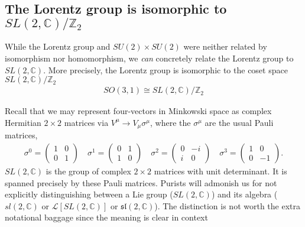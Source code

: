\subsection{\texorpdfstring{The Lorentz group is isomorphic to $SL(2,\mathbb{C})/\mathbb{Z}_2$}{The Lorentz group is isomorphic to SL(2,C)/Z2}}

While the Lorentz group and $SU(2)\times SU(2)$ were neither related by isomorphism nor homomorphism, we \textit{can} concretely relate the Lorentz group to $SL(2,\mathbb{C})$. More precisely, the Lorentz group is isomorphic to the coset space $SL(2,\mathbb{C})/\mathbb{Z}_2$
\begin{align}
    SO(3,1) \cong SL(2,\mathbb{C})/\mathbb{Z}_2
\end{align}

Recall that we may represent four-vectors in Minkowski space as complex Hermitian $2\times 2$ matrices via $V^\mu \rightarrow V_\mu\sigma^\mu$, where the $\sigma^\mu$ are the usual Pauli matrices,
\begin{align}
    \sigma^0 = 
    \begin{pmatrix}
        1 & 0\\
        0 & 1
    \end{pmatrix}
    \quad
    \sigma^1 = 
    \begin{pmatrix}
        0 & 1\\
        1 & 0
    \end{pmatrix}
    \quad
    \sigma^2 = 
    \begin{pmatrix}
        0 & -i\\
        i & 0
    \end{pmatrix}
    \quad
    \sigma^3 = 
    \begin{pmatrix}
        1 & 0\\
        0 & -1
    \end{pmatrix}.\label{eq:SUSYalg:pauli:matrices}
\end{align}
$SL(2,\mathbb C)$ is the group of complex $2\times 2$ matrices with unit determinant. It is spanned precisely by these Pauli matrices. 
Purists will admonish us for not explicitly distinguishing between a Lie group ($SL(2,\mathbb{C})$) and its algebra ($sl(2,\mathbb{C})$ or $\mathcal{L}[SL(2,\mathbb{C})]$ or $\mathfrak{sl}(2,\mathbb{C})$). The distinction is not worth the extra notational baggage since the meaning is clear in context


